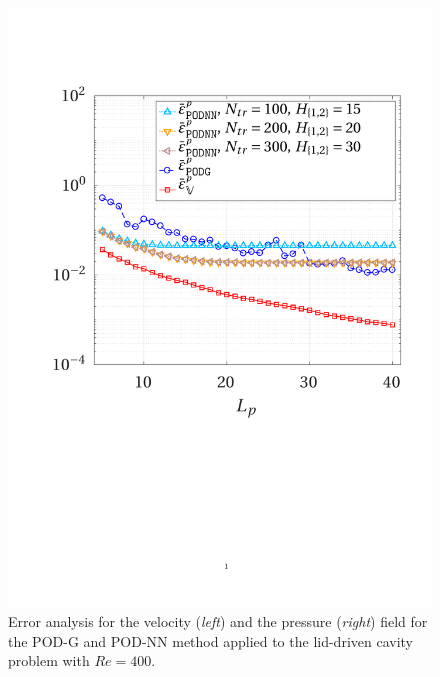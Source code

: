 \documentclass[12pt, a4paper, twoside, openright]{report}
\numberwithin{equation}{chapter}
\theoremstyle{theorem}
\theoremstyle{definition}
\theoremstyle{remark}
\theoremstyle{proposition}
\numberwithin{figure}{chapter}
\begin{document}
\begin{figure}[H]
			\includegraphics[scale = 0.44, trim = {2cm 9cm 1.5cm 3.5cm}, clip]{dc_400_p_error_vs_rank}
			
			\caption{Error analysis for the velocity (\emph{left}) and the pressure (\emph{right}) field for the POD-G and POD-NN method applied to the lid-driven cavity problem with $Re = 400$.}
			\label{}
		\end{figure}
		
\end{document}
